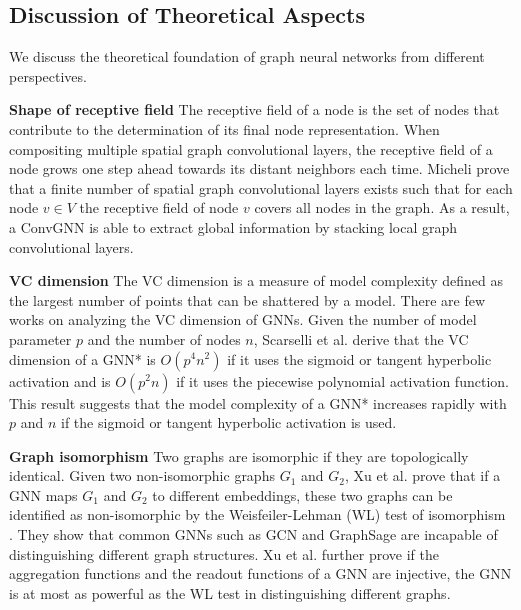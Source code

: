 	\subsection{Discussion of Theoretical Aspects}
	We discuss the theoretical foundation of graph neural networks from different perspectives.
	
	\vspace{2mm}
	\noindent\textbf{Shape of receptive field}
    The receptive field of a node is the set of nodes that contribute to the determination of its final node representation. When compositing multiple spatial graph convolutional layers, the receptive field of a node grows one step ahead towards its distant neighbors each time. Micheli  \cite{micheli2009neural} prove that a finite number of spatial graph convolutional layers exists such that for each node $v \in V$ the receptive field of node $v$ covers all nodes in the graph. As a result, a ConvGNN is able to extract global information by stacking local graph convolutional layers.  
    
	\vspace{2mm}
	\noindent\textbf{VC dimension}
	The VC dimension is a measure of model complexity defined as the largest number of points that can be shattered by a model. There are few works on analyzing the VC dimension of GNNs. Given the number of model parameter $p$ and the number of nodes $n$, Scarselli et al.  \cite{scarselli2018vapnik} derive that the VC dimension of a GNN* \cite{scarselli2009graph} is $O(p^4n^2)$ if it uses the sigmoid or tangent hyperbolic activation and is $O(p^2n)$ if it uses the piecewise polynomial activation function. This result
	suggests that the model complexity of a GNN* \cite{scarselli2009graph} increases rapidly with $p$ and $n$ if the sigmoid or tangent hyperbolic activation is used.  

	
	
	\vspace{2mm}
	\noindent\textbf{Graph isomorphism} Two graphs are isomorphic if they are topologically identical. Given two non-isomorphic graphs $G_1$ and $G_2$, Xu et al. \cite{xu2019how} prove that if a GNN maps $G_1$ and $G_2$ to different embeddings, these two graphs can be identified as non-isomorphic by the Weisfeiler-Lehman (WL) test of isomorphism \cite{weisfeiler1968reduction}. They show that common GNNs such as GCN \cite{kipf2017semi} and GraphSage \cite{hamilton2017inductive} are incapable of distinguishing different graph structures. Xu et al. \cite{xu2019how} further prove if the aggregation functions and the readout functions of a GNN are injective, the GNN is at most as powerful as the WL test in distinguishing different graphs.
	
